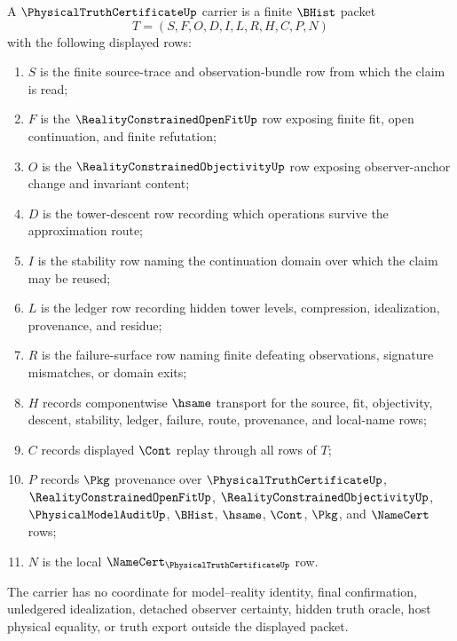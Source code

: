 \begin{definition}
\label{def:physical-truth-certificate-carrier}
A $\PhysicalTruthCertificateUp$ carrier is a finite $\BHist$ packet
$$
T=(S,F,O,D,I,L,R,H,C,P,N)
$$
with the following displayed rows:
\begin{enumerate}
\item $S$ is the finite source-trace and observation-bundle row from which the claim is read;
\item $F$ is the $\RealityConstrainedOpenFitUp$ row exposing finite fit, open continuation, and finite refutation;
\item $O$ is the $\RealityConstrainedObjectivityUp$ row exposing observer-anchor change and invariant content;
\item $D$ is the tower-descent row recording which operations survive the approximation route;
\item $I$ is the stability row naming the continuation domain over which the claim may be reused;
\item $L$ is the ledger row recording hidden tower levels, compression, idealization, provenance, and residue;
\item $R$ is the failure-surface row naming finite defeating observations, signature mismatches, or domain exits;
\item $H$ records componentwise $\hsame$ transport for the source, fit, objectivity, descent, stability, ledger, failure, route, provenance, and local-name rows;
\item $C$ records displayed $\Cont$ replay through all rows of $T$;
\item $P$ records $\Pkg$ provenance over $\PhysicalTruthCertificateUp$, $\RealityConstrainedOpenFitUp$, $\RealityConstrainedObjectivityUp$, $\PhysicalModelAuditUp$, $\BHist$, $\hsame$, $\Cont$, $\Pkg$, and $\NameCert$ rows;
\item $N$ is the local $\NameCert_{\PhysicalTruthCertificateUp}$ row.
\end{enumerate}
The carrier has no coordinate for model--reality identity, final confirmation, unledgered idealization, detached observer certainty, hidden truth oracle, host physical equality, or truth export outside the displayed packet.
\end{definition}

